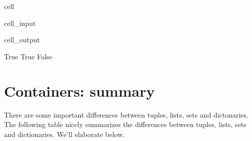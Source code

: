 \documentclass[letterpaper,10pt,english]{jupyterBook}
\begin{document}
\begin{sphinxuseclass}{cell}\begin{sphinxVerbatimInput}

\begin{sphinxuseclass}{cell_input}
\begin{sphinxVerbatim}[commandchars=\\\{\}]
  
  
  
  
\end{sphinxVerbatim}

\end{sphinxuseclass}\end{sphinxVerbatimInput}
\begin{sphinxVerbatimOutput}

\begin{sphinxuseclass}{cell_output}
\begin{sphinxVerbatim}[commandchars=\\\{\}]
True
True
False
\end{sphinxVerbatim}

\end{sphinxuseclass}\end{sphinxVerbatimOutput}

\end{sphinxuseclass}

\section{Containers: summary}
\label{\detokenize{notebooks/02_Containers/02_Containers_student:containers-summary}}
\sphinxAtStartPar
There are some important differences between tuples, lists, sets and dictonaries. The following table  nicely summarizes the differences between tuples, lists, sets and dictionaries. We’ll elaborate below.
\end{document}
